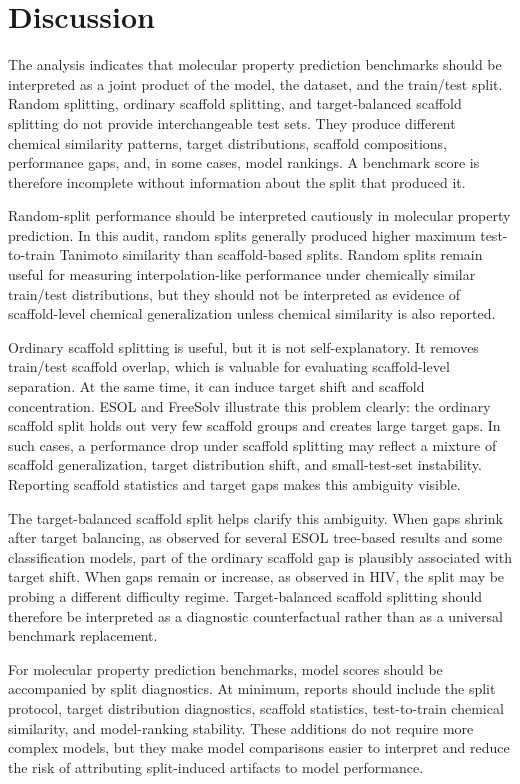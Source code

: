 \section{Discussion}

The analysis indicates that molecular property prediction benchmarks should be interpreted as a joint product of the model, the dataset, and the train/test split. Random splitting, ordinary scaffold splitting, and target-balanced scaffold splitting do not provide interchangeable test sets. They produce different chemical similarity patterns, target distributions, scaffold compositions, performance gaps, and, in some cases, model rankings. A benchmark score is therefore incomplete without information about the split that produced it.

Random-split performance should be interpreted cautiously in molecular property prediction. In this audit, random splits generally produced higher maximum test-to-train Tanimoto similarity than scaffold-based splits. Random splits remain useful for measuring interpolation-like performance under chemically similar train/test distributions, but they should not be interpreted as evidence of scaffold-level chemical generalization unless chemical similarity is also reported.

Ordinary scaffold splitting is useful, but it is not self-explanatory. It removes train/test scaffold overlap, which is valuable for evaluating scaffold-level separation. At the same time, it can induce target shift and scaffold concentration. ESOL and FreeSolv illustrate this problem clearly: the ordinary scaffold split holds out very few scaffold groups and creates large target gaps. In such cases, a performance drop under scaffold splitting may reflect a mixture of scaffold generalization, target distribution shift, and small-test-set instability. Reporting scaffold statistics and target gaps makes this ambiguity visible.

The target-balanced scaffold split helps clarify this ambiguity. When gaps shrink after target balancing, as observed for several ESOL tree-based results and some classification models, part of the ordinary scaffold gap is plausibly associated with target shift. When gaps remain or increase, as observed in HIV, the split may be probing a different difficulty regime. Target-balanced scaffold splitting should therefore be interpreted as a diagnostic counterfactual rather than as a universal benchmark replacement.

For molecular property prediction benchmarks, model scores should be accompanied by split diagnostics. At minimum, reports should include the split protocol, target distribution diagnostics, scaffold statistics, test-to-train chemical similarity, and model-ranking stability. These additions do not require more complex models, but they make model comparisons easier to interpret and reduce the risk of attributing split-induced artifacts to model performance.


